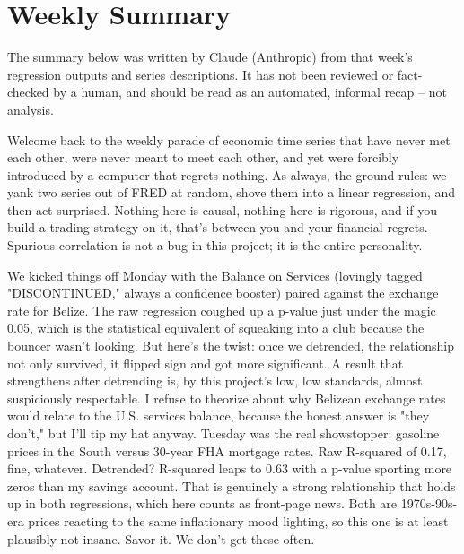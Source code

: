 \section{Weekly Summary}

\begin{tcolorbox}[colback=yellow!10,colframe=black!50,title=AI-Generated Content]
\noindent The summary below was written by Claude (Anthropic) from that week's regression outputs and series descriptions. It has not been reviewed or fact-checked by a human, and should be read as an automated, informal recap -- not analysis.
\end{tcolorbox}

Welcome back to the weekly parade of economic time series that have never met each other, were never meant to meet each other, and yet were forcibly introduced by a computer that regrets nothing. As always, the ground rules: we yank two series out of FRED at random, shove them into a linear regression, and then act surprised. Nothing here is causal, nothing here is rigorous, and if you build a trading strategy on it, that's between you and your financial regrets. Spurious correlation is not a bug in this project; it is the entire personality.

We kicked things off Monday with the Balance on Services (lovingly tagged "DISCONTINUED," always a confidence booster) paired against the exchange rate for Belize. The raw regression coughed up a p-value just under the magic 0.05, which is the statistical equivalent of squeaking into a club because the bouncer wasn't looking. But here's the twist: once we detrended, the relationship not only survived, it flipped sign and got more significant. A result that strengthens after detrending is, by this project's low, low standards, almost suspiciously respectable. I refuse to theorize about why Belizean exchange rates would relate to the U.S. services balance, because the honest answer is "they don't," but I'll tip my hat anyway. Tuesday was the real showstopper: gasoline prices in the South versus 30-year FHA mortgage rates. Raw R-squared of 0.17, fine, whatever. Detrended? R-squared leaps to 0.63 with a p-value sporting more zeros than my savings account. That is genuinely a strong relationship that holds up in both regressions, which here counts as front-page news. Both are 1970s-90s-era prices reacting to the same inflationary mood lighting, so this one is at least plausibly not insane. Savor it. We don't get these often.

